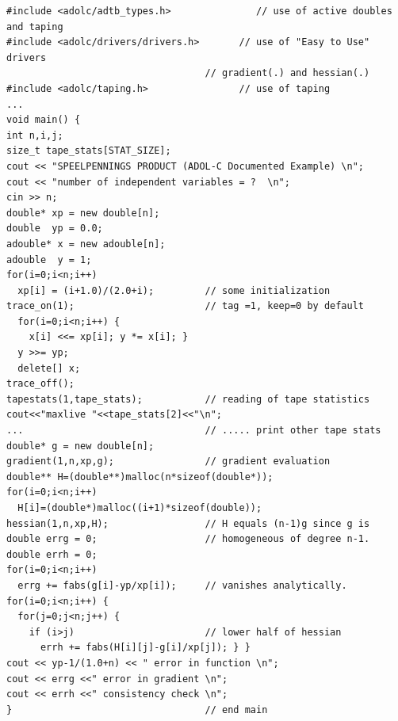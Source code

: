\documentclass[11pt,twoside]{article}
\begin{document}
\begin{verbatim}
#include <adolc/adtb_types.h>               // use of active doubles and taping
#include <adolc/drivers/drivers.h>       // use of "Easy to Use" drivers 
                                   // gradient(.) and hessian(.)
#include <adolc/taping.h>                // use of taping
...
void main() {
int n,i,j;
size_t tape_stats[STAT_SIZE];
cout << "SPEELPENNINGS PRODUCT (ADOL-C Documented Example) \n";
cout << "number of independent variables = ?  \n";
cin >> n;
double* xp = new double[n];          
double  yp = 0.0;
adouble* x = new adouble[n];      
adouble  y = 1;
for(i=0;i<n;i++)
  xp[i] = (i+1.0)/(2.0+i);         // some initialization
trace_on(1);                       // tag =1, keep=0 by default
  for(i=0;i<n;i++) {
    x[i] <<= xp[i]; y *= x[i]; }      
  y >>= yp;
  delete[] x;                      
trace_off();
tapestats(1,tape_stats);           // reading of tape statistics
cout<<"maxlive "<<tape_stats[2]<<"\n";
...                                // ..... print other tape stats
double* g = new double[n];        
gradient(1,n,xp,g);                // gradient evaluation
double** H=(double**)malloc(n*sizeof(double*));
for(i=0;i<n;i++)
  H[i]=(double*)malloc((i+1)*sizeof(double)); 
hessian(1,n,xp,H);                 // H equals (n-1)g since g is
double errg = 0;                   // homogeneous of degree n-1.
double errh = 0;
for(i=0;i<n;i++)
  errg += fabs(g[i]-yp/xp[i]);     // vanishes analytically.
for(i=0;i<n;i++) {
  for(j=0;j<n;j++) {
    if (i>j)                       // lower half of hessian
      errh += fabs(H[i][j]-g[i]/xp[j]); } }
cout << yp-1/(1.0+n) << " error in function \n";
cout << errg <<" error in gradient \n";
cout << errh <<" consistency check \n";
}                                  // end main
\end{verbatim}
%
\end{document}
